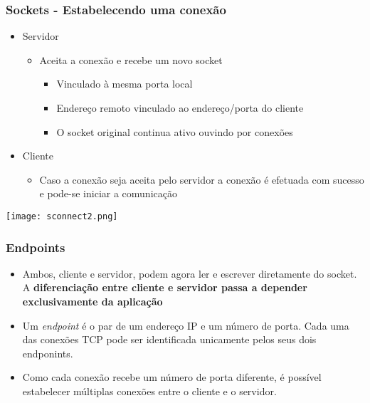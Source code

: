 \documentclass[Ligatures=TeX,table,brazil,svgnames,usetotalslideindicator,comp
ress,10pt]{beamer}
\begin{document}
\begin{frame}
  \frametitle{Sockets - Estabelecendo uma conexão}
  \begin{itemize}

    \item Servidor
    \begin{itemize}
      \item Aceita a conexão e recebe um novo socket
      \begin{itemize}
        \item Vinculado à mesma porta local
        \item Endereço remoto vinculado ao endereço/porta do cliente
        \item O socket original continua ativo ouvindo por conexões
      \end{itemize}
    \end{itemize}

    \item Cliente
    \begin{itemize}
    \item Caso a conexão seja aceita pelo servidor a conexão é efetuada
      com sucesso e pode-se iniciar a comunicação
    \end{itemize}
  \end{itemize}
  \centering
  \texttt{[image: sconnect2.png]}
\end{frame}

\begin{frame}
  \frametitle{Endpoints}
  \begin{itemize}
    \item Ambos, cliente e servidor, podem agora ler e escrever
      diretamente do socket. A \textbf{diferenciação entre cliente e servidor
      passa a depender exclusivamente da aplicação}
    \item Um \emph{endpoint} é o par de um endereço IP e um número de
      porta. Cada uma das conexões TCP pode ser identificada unicamente
      pelos seus dois endponints.
    \item Como cada conexão recebe um número de porta diferente, é
      possível estabelecer múltiplas conexões entre o cliente e o
      servidor.
  \end{itemize}
\end{frame}
\end{document}
